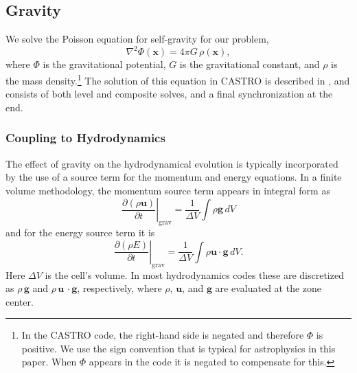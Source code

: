 \documentclass{emulateapj}
\begin{document}
\subsection{Gravity}
\label{sec:gravity}

We solve the Poisson equation for self-gravity for our problem,
\begin{equation}
  \nabla^2 \Phi(\mathbf{x}) = 4\pi G\, \rho(\mathbf{x}),
\end{equation}
where $\Phi$ is the gravitational potential, $G$ is the gravitational
constant, and $\rho$ is the mass density.\footnote{In the CASTRO code, the 
right-hand side is negated and therefore $\Phi$ is positive. We use the 
sign convention that is typical for astrophysics in this paper. 
When $\Phi$ appears in the code it is negated to compensate for this.} 
The solution of this equation in CASTRO is described in \cite{castro}, and
consists of both level and composite solves, and a final
synchronization at the end.

\subsubsection{Coupling to Hydrodynamics}\label{sec:gravity_hydro_coupling}

The effect of gravity on the hydrodynamical evolution is typically
incorporated by the use of a source term for the momentum and energy
equations. In a finite volume methodology, the momentum source term appears in 
integral form as
\begin{equation}
  \left.\frac{\partial (\rho \mathbf{u})}{\partial t}\right|_{\text{grav}} = \frac{1}{\Delta V} \int \rho \mathbf{g}\, dV
\end{equation}
and for the energy source term it is
\begin{equation}
  \left.\frac{\partial (\rho E)}{\partial t}\right|_{\text{grav}} = \frac{1}{\Delta V} \int \rho \mathbf{u}\cdot\mathbf{g}\, dV \label{eq:cell_center_gravity_source}.
\end{equation}
Here $\Delta V$ is the cell's volume.
In most hydrodynamics codes these are discretized as $\rho\,
\mathbf{g}$ and $\rho\, \mathbf{u}\,\cdot\mathbf{g}$, respectively, 
where $\rho$, $\mathbf{u}$, and $\mathbf{g}$ 
are evaluated at the zone center. 
\end{document}
